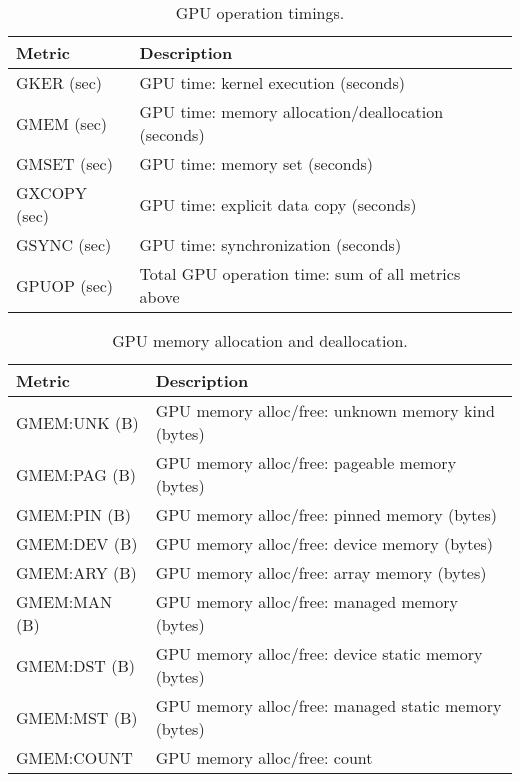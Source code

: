 \begin{table}[t]
\centering
\begin{tabular}{|l|l|}\hline
Metric & Description\\\hline\hline
 GKER (sec)  &  GPU time: kernel execution (seconds)  \\\hline 
  GMEM (sec)  &  GPU time: memory allocation/deallocation (seconds)  \\\hline 
  GMSET (sec)  &  GPU time: memory set (seconds)  \\\hline 
  GXCOPY (sec)  &  GPU time: explicit data copy (seconds)  \\\hline 
  GSYNC (sec)  &  GPU time: synchronization (seconds)  \\\hline 
 GPUOP (sec) & Total GPU operation time: sum of all metrics above \\\hline
\end{tabular}
\caption{GPU operation timings.}
\label{table:gtimes}
\end{table}

\begin{table}[t]
\centering
\begin{tabular}{|l|l|}\hline
Metric & Description\\\hline\hline
 GMEM:UNK (B)  &  GPU memory alloc/free: unknown memory kind (bytes)  \\\hline
  GMEM:PAG (B)  &  GPU memory alloc/free: pageable memory (bytes)  \\\hline
  GMEM:PIN (B)  &  GPU memory alloc/free: pinned memory (bytes)  \\\hline
  GMEM:DEV (B)  &  GPU memory alloc/free: device memory (bytes)  \\\hline
  GMEM:ARY (B)  &  GPU memory alloc/free: array memory (bytes)  \\\hline
  GMEM:MAN (B)  &  GPU memory alloc/free: managed memory (bytes)  \\\hline
  GMEM:DST (B)  &  GPU memory alloc/free: device static memory (bytes)  \\\hline
  GMEM:MST (B)  &  GPU memory alloc/free: managed static memory (bytes)  \\\hline
  GMEM:COUNT  &  GPU memory alloc/free: count  \\\hline
\end{tabular}
\caption{GPU memory allocation and deallocation.}
\label{table:gmem}
\end{table}


